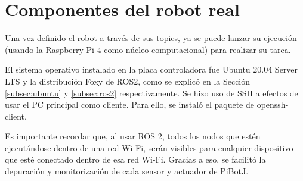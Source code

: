 
\section{Componentes del robot real}
\label{sec:configrf}

Una vez definido el robot a través de sus topics, ya se puede lanzar su ejecución (usando la Raspberry Pi 4 como núcleo computacional) para realizar su tarea.

El sistema operativo instalado en la placa controladora fue Ubuntu 20.04 Server \acs{LTS} y la distribución Foxy de ROS2, como se explicó en la Sección \ref{subsec:ubuntu} y \ref{subsec:ros2} respectivamente. Se hizo uso de SSH a efectos de usar el PC principal como cliente. Para ello, se instaló el paquete de openssh-client.



Es importante recordar que, al usar ROS 2, todos los nodos que estén ejecutándose dentro de una red Wi-Fi, serán visibles para cualquier dispositivo que esté conectado dentro de esa red Wi-Fi. Gracias a eso, se facilitó la depuración y monitorización de cada sensor y actuador de PiBotJ. 

